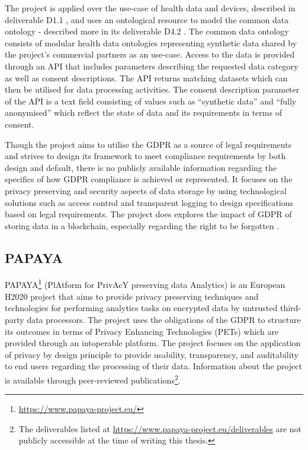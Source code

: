The project is applied over the use-case of health data and devices, described in deliverable D1.1 \cite{noauthor_d1.1_initial-list--main-requirements.pdf_nodate}, and uses an ontological resource to model the common data ontology - described more in its deliverable D4.2 \cite{teodoro_d4.2-mhmd-ontological-resources.pdf_2018}. The common data ontology consists of modular health data ontologies representing synthetic data shared by the project's commercial partners as an use-case.
Access to the data is provided through an API that includes parameters describing the requested data category as well as consent descriptions. The API returns matching datasets which can then be utilised for data processing activities. The consent description parameter of the API is a text field consisting of values such as ``synthetic data'' and ``fully anonymised'' which reflect the state of data and its requirements in terms of consent. 

Though the project aims to utilise the GDPR as a source of legal requirements and strives to design its framework to meet compliance requirements by both design and default, there is no publicly available information regarding the specifics of how GDPR compliance is achieved or represented.
It focuses on the privacy preserving and security aspects of data storage by using technological solutions such as access control and transparent logging to design specifications based on legal requirements.
The project does explores the impact of GDPR of storing data in a blockchain, especially regarding the right to be forgotten \cite{bayle_when_2018}.

\subsection{PAPAYA}
PAPAYA\footnote{\url{https://www.papaya-project.eu/}} (PlAtform for PrivAcY preserving data Analytics) is an European H2020 project that aims to provide privacy preserving techniques and technologies for performing analytics tasks on encrypted data by untrusted third-party data processors. The project uses the obligations of the GDPR to structure its outcomes in terms of Privacy Enhancing Technologies (PETs) which are provided through an intoperable platform. The project focuses on the application of privacy by design principle to provide usability, transparency, and auditability to end users regarding the processing of their data. Information about the project is available through peer-reviewed publications\footnote{The deliverables listed at \url{https://www.papaya-project.eu/deliverables} are not publicly accessible at the time of writing this thesis.}.

